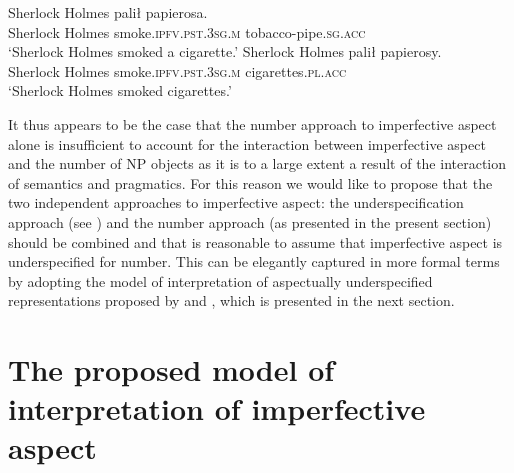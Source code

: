 \documentclass[output=paper]{langscibook}
\begin{document}
\ea\label{jan-bla:fansb:kb:ex25}
\gll Sherlock Holmes palił papierosa.\\  
     Sherlock Holmes smoke.\textsc{ipfv}.\textsc{pst}.\textsc{3sg}.\textsc{m} tobacco-pipe.\textsc{sg}.\textsc{acc}\\
\glt ‘Sherlock Holmes smoked a cigarette.’
\ex\label{jan-bla:fansb:kb:ex26}
\gll Sherlock Holmes palił papierosy.\\  
     Sherlock Holmes smoke.\textsc{ipfv}.\textsc{pst}.\textsc{3sg}.\textsc{m} cigarettes.\textsc{pl}.\textsc{acc}\\
\glt ‘Sherlock Holmes smoked cigarettes.’
\z

\noindent It thus appears to be the case that the number approach to imperfective aspect alone is insufficient to account for the interaction between imperfective aspect and the number of NP objects as it is to a large extent a result of the interaction of semantics and pragmatics. For this reason we would like to propose that the two independent approaches to imperfective aspect: the underspecification approach (see ) and the number approach (as presented in the present section) should be combined and that is reasonable to assume that imperfective aspect is underspecified for number. This can be elegantly captured in more formal terms by adopting the model of interpretation of aspectually underspecified representations proposed by \citet{Dolling2014} and \citet{Egg2005}, which is presented in the next section.

\section{The proposed model of interpretation of imperfective aspect}\label{jan-bla:fansb:kb:sec5}
\end{document}
